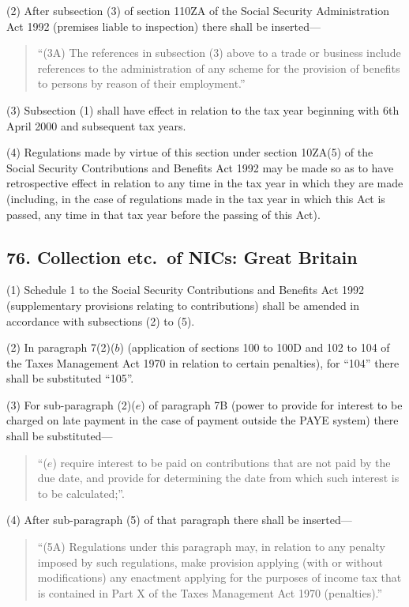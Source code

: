 \documentclass[12pt,a4paper]{article}
\begin{document}
(2) After subsection (3)  of section 110ZA of the Social Security Administration Act 1992 (premises liable to inspection) there shall be inserted—
\begin{quotation}
“(3A) The references in subsection (3)  above to a trade or business include references to the administration of any scheme for the provision of benefits to persons by reason of their employment.”
\end{quotation}

(3) Subsection (1)  shall have effect in relation to the tax year beginning with 6th April 2000 and subsequent tax years.

(4) Regulations made by virtue of this section under section 10ZA(5)  of the Social Security Contributions and Benefits Act 1992 may be made so as to have retrospective effect in relation to any time in the tax year in which they are made (including, in the case of regulations made in the tax year in which this Act is passed, any time in that tax year before the passing of this Act).

\subsection{76. Collection etc.\ of NICs: Great Britain}

(1) Schedule 1 to the Social Security Contributions and Benefits Act 1992 (supplementary provisions relating to contributions) shall be amended in accordance with subsections (2)  to (5).

(2) In paragraph 7(2)($b$)  (application of sections 100 to 100D and 102 to 104 of the Taxes Management Act 1970 in relation to certain penalties), for “104” there shall be substituted “105”.

(3) For sub-paragraph (2)($e$)  of paragraph 7B (power to provide for interest to be charged on late payment in the case of payment outside the PAYE system) there shall be substituted—
\begin{quotation}
“($e$) require interest to be paid on contributions that are not paid by the due date, and provide for determining the date from which such interest is to be calculated;”.
\end{quotation}

(4) After sub-paragraph (5)  of that paragraph there shall be inserted—
\begin{quotation}
“(5A) Regulations under this paragraph may, in relation to any penalty imposed by such regulations, make provision applying (with or without modifications) any enactment applying for the purposes of income tax that is contained in Part X of the Taxes Management Act 1970 (penalties).”
\end{quotation}
\end{document}
